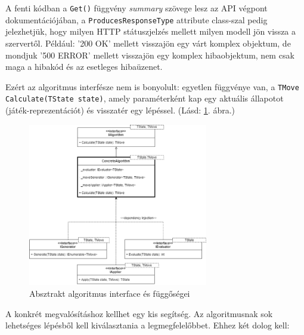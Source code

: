 \documentclass[twoside, a4paper, 12pt]{article}
\begin{document}
A fenti kódban a \texttt{Get()} függvény \textit{summary} szövege lesz az API végpont dokumentációjában, a \texttt{ProducesResponseType} attribute class-szal pedig jelezhetjük, hogy milyen HTTP státuszjelzés mellett milyen modell jön vissza a szervertől. Például: '200 OK' mellett visszajön egy várt komplex objektum, de mondjuk '500 ERROR' mellett visszajön egy komplex hibaobjektum, nem csak maga a hibakód és az esetleges hibaüzenet.
































Ezért az algoritmus interfésze nem is bonyolult: egyetlen függvénye van, a \texttt{TMove Calculate(TState state)}, amely paraméterként kap egy aktuális állapotot (játék-reprezentációt) és visszatér egy lépéssel. (Lásd: \ref{fig:algorithmAbstractDiagram}. ábra.)

\begin{figure}[htbp]
	\centering
	\includegraphics[width=0.7\textwidth]{img/algorithmAbstractDiagram.png}
	\caption{Absztrakt algoritmus interface és függőségei}
	\label{fig:algorithmAbstractDiagram}
\end{figure}

A konkrét megvalósításhoz kellhet egy kis segítség. Az algoritmusnak sok lehetséges lépésből kell kiválasztania a legmegfelelőbbet. Ehhez két dolog kell:
\end{document}
